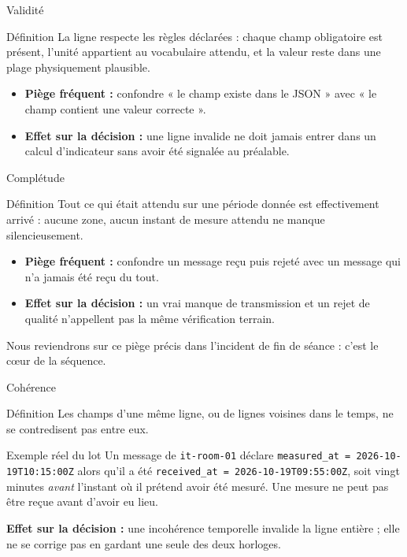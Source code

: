 \documentclass[aspectratio=169]{beamer}
\begin{document}
\begin{frame}{Validité}
  \begin{block}{Définition}
    La ligne respecte les règles déclarées : chaque champ obligatoire est présent, l'unité appartient au vocabulaire attendu, et la valeur reste dans une plage physiquement plausible.
  \end{block}
  \begin{itemize}
    \item \textbf{Piège fréquent :} confondre « le champ existe dans le JSON » avec « le champ contient une valeur correcte ».
    \item \textbf{Effet sur la décision :} une ligne invalide ne doit jamais entrer dans un calcul d'indicateur sans avoir été signalée au préalable.
  \end{itemize}
\end{frame}

\begin{frame}{Complétude}
  \begin{block}{Définition}
    Tout ce qui était attendu sur une période donnée est effectivement arrivé : aucune zone, aucun instant de mesure attendu ne manque silencieusement.
  \end{block}
  \begin{itemize}
    \item \textbf{Piège fréquent :} confondre un message reçu puis rejeté avec un message qui n'a jamais été reçu du tout.
    \item \textbf{Effet sur la décision :} un vrai manque de transmission et un rejet de qualité n'appellent pas la même vérification terrain.
  \end{itemize}
  \alert{Nous reviendrons sur ce piège précis dans l'incident de fin de séance : c'est le cœur de la séquence.}
\end{frame}

\begin{frame}{Cohérence}
  \begin{block}{Définition}
    Les champs d'une même ligne, ou de lignes voisines dans le temps, ne se contredisent pas entre eux.
  \end{block}
  \begin{exampleblock}{Exemple réel du lot}
    Un message de \texttt{it-room-01} déclare \texttt{measured\_at = 2026-10-19T10:15:00Z} alors qu'il a été \texttt{received\_at = 2026-10-19T09:55:00Z}, soit vingt minutes \emph{avant} l'instant où il prétend avoir été mesuré. Une mesure ne peut pas être reçue avant d'avoir eu lieu.
  \end{exampleblock}
  \textbf{Effet sur la décision :} une incohérence temporelle invalide la ligne entière ; elle ne se corrige pas en gardant une seule des deux horloges.
\end{frame}
\end{document}

